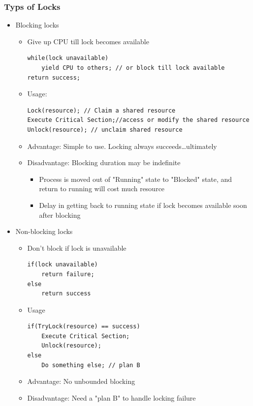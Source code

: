 \documentclass[12pt]{article}
\begin{document}
\subsubsection{Typs of Locks}
\begin{itemize}
    \item Blocking locks \begin{itemize}
        \item Give up CPU till lock becomes available \begin{lstlisting}
while(lock unavailable)
    yield CPU to others; // or block till lock available        
return success;
            \end{lstlisting}
        \item Usage: \begin{lstlisting}
Lock(resource); // Claim a shared resource
Execute Critical Section;//access or modify the shared resource
Unlock(resource); // unclaim shared resource
        \end{lstlisting}
        \item Advantage: Simple to use. Locking always succeeds…ultimately
        \item Disadvantage: Blocking duration may be indefinite \begin{itemize}
            \item Process is moved out of "Running" state to "Blocked" state, and return to running will cost much resource
            \item Delay in getting back to running state if lock becomes available soon after blocking
        \end{itemize}
    \end{itemize}
    \item Non-blocking locks \begin{itemize}
        \item Don’t block if lock is unavailable \begin{lstlisting}
if(lock unavailable)
    return failure;
else
    return success
        \end{lstlisting}
        \item Usage \begin{lstlisting}
if(TryLock(resource) == success)
    Execute Critical Section;
    Unlock(resource);
else
    Do something else; // plan B
        \end{lstlisting}
        \item Advantage: No unbounded blocking
        \item Disadvantage: Need a "plan B" to handle locking failure

\end{itemize}
\end{itemize}
\end{document}
